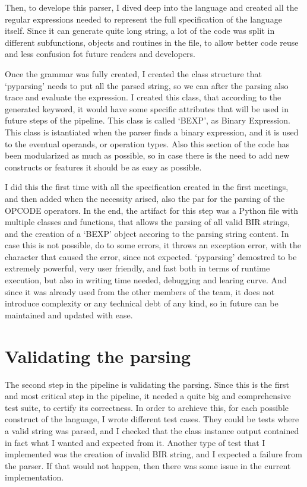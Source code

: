 Then, to develope this parser, I dived deep into the language and created all
the regular expressions needed to represent the full specification of the
language itself. Since it can generate quite long string, a lot of the code was
split in different subfunctions, objects and routines in the file, to allow
better code reuse and less confusion fot future readers and developers.

Once the grammar was fully created, I created the class structure that `pyparsing'
needs to put all the parsed string, so we can after the parsing also trace and
evaluate the expression. I created this class, that according to the generated
keyword, it would have some specific attributes that will be used in future steps
of the pipeline. This class is called `BEXP', as Binary Expression. This class
is istantiated when the parser finds a binary expression, and it is used to the eventual
operands, or operation types. Also this section of the code has been modularized
as much as possible, so in case there is the need to add new constructs or
features it should be as easy as possible.

I did this the first time with all the specification created in the first
meetings, and then added when the necessity arised, also the par for the parsing
of the OPCODE operators. In the end, the artifact for this step was a Python
file with multiple classes and functions, that allows the parsing of all valid BIR
strings, and the creation of a `BEXP' object accoring to the parsing string
content. In case this is not possible, do to some errors, it throws an exception
error, with the character that caused the error, since not expected. `pyparsing'
demostred to be extremely powerful, very user friendly, and fast both in terms
of runtime execution, but also in writing time needed, debugging and learing
curve. And since it was already used from the other members of the team, it does
not introduce complexity or any technical debt of any kind, so in future can be maintained
and updated with ease.

\section{Validating the parsing}
\label{cha:Validating the parsing} The second step in the pipeline is validating
the parsing. Since this is the first and most critical step in the pipeline, it needed
a quite big and comprehensive test suite, to certify its correctness. In order to
archieve this, for each possible construct of the language, I wrote different test
cases. They could be tests where a valid string was parsed, and I checked that the
class instance output contained in fact what I wanted and expected from it.
Another type of test that I implemented was the creation of invalid BIR string, and
I expected a failure from the parser. If that would not happen, then there was some
issue in the current implementation.

